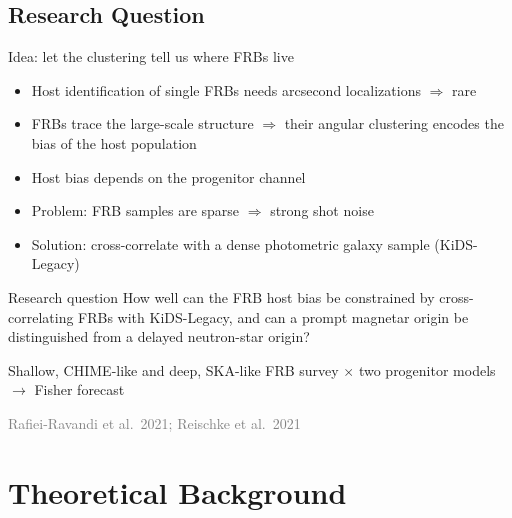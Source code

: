 \documentclass[aspectratio=1610, 10pt]{beamer}
\newcommand{\source}[1]{{\par\hfill\tiny\textcolor{gray}{#1}\par}}
\begin{document}
\subsection{Research Question}
\begin{frame}{Idea: let the clustering tell us where FRBs live}
  \begin{itemize}
    \item Host identification of single FRBs needs arcsecond localizations $\Rightarrow$ rare
    \item FRBs trace the large-scale structure $\Rightarrow$ their \alert{angular clustering} encodes the
      bias of the host population
    \item Host bias depends on the progenitor channel
    \item Problem: FRB samples are sparse $\Rightarrow$ strong \alert{shot noise}
    \item Solution: cross-correlate with a \alert{dense photometric galaxy sample} (KiDS-Legacy)
  \end{itemize}
  \bigskip
  \begin{block}{Research question}
    How well can the FRB host bias be constrained by cross-correlating FRBs with KiDS-Legacy,
    and can a prompt magnetar origin be distinguished from a delayed neutron-star origin?
  \end{block}
  \medskip
  Shallow, CHIME-like and deep, SKA-like FRB survey $\times$ two progenitor models $\to$ Fisher forecast
  \source{Rafiei-Ravandi et al.\ 2021; Reischke et al.\ 2021}
\end{frame}

\section{Theoretical Background}
\end{document}
